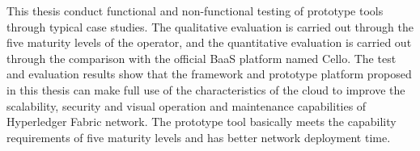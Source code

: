 \documentclass[macfonts,master,oneside]{njuthesis}
\begin{document}
\begin{englishabstract}
  This thesis conduct functional and non-functional testing of prototype tools through typical case studies. The qualitative evaluation is carried out through the five maturity levels of the operator, and the quantitative evaluation is carried out through the comparison with the official BaaS platform named Cello. The test and evaluation results show that the framework and prototype platform proposed in this thesis can make full use of the characteristics of the cloud to improve the scalability, security and visual operation and maintenance capabilities of Hyperledger Fabric network. The prototype tool basically meets the capability requirements of five maturity levels and has better network deployment time.
  
\end{englishabstract}

%
%
%
%

\tableofcontents

\listoffigures

\listoftables

\mainmatter






\end{document}
